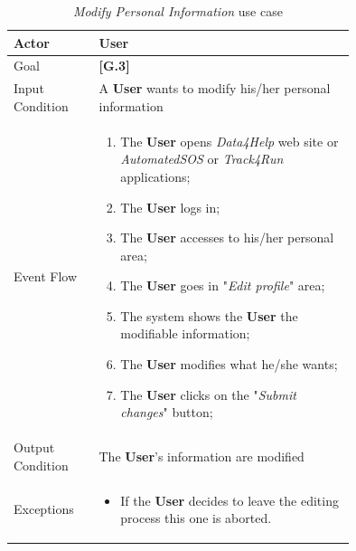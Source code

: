 \begin{center}
\begin{table}[H]
\begin{tabular}{ | l | p{0.75\linewidth} | }
  \hline
    Actor & \textbf{User} \\ \hline
    Goal & \textbf{[G.3]} \\ \hline
    Input Condition & A \textbf{User} wants to modify his/her personal information\\ \hline
    Event Flow & \begin{minipage}[t]{0.7\textwidth}
      \begin{enumerate}
        \item The \textbf{User} opens \textit{Data4Help} web site or \textit{AutomatedSOS} or \textit{Track4Run} applications;
        \item The \textbf{User} logs in;
        \item The \textbf{User} accesses to his/her personal area;
        \item The \textbf{User} goes in "\textit{Edit profile}" area;
        \item The system shows the \textbf{User} the modifiable information;
        \item The \textbf{User} modifies what he/she wants;
        \item The \textbf{User} clicks on the "\textit{Submit changes}" button;
      \end{enumerate}
    \smallskip
  \end{minipage} \\ \hline
  Output Condition & The \textbf{User}'s information are modified\\ \hline
  Exceptions & \begin{minipage}[t]{0.7\textwidth}
    \begin{itemize}
      \smallskip
      \item If the \textbf{User} decides to leave the editing process this one is aborted.
    \end{itemize}
    \smallskip
  \end{minipage}  \\ \hline
\end{tabular}
\caption{\textit{Modify Personal Information} use case}
\label{table:modifyPersonalInformationTable}
\end{table}
\end{center}

